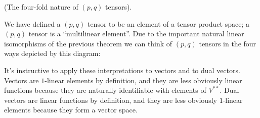 \begin{remark}
    (The four-fold nature of $(p, q)$ tensors).
    
    We have defined a $(p, q)$ tensor to be an element of a tensor product space; a $(p, q)$ tensor is a ``multilinear element''. Due to the important natural linear isomorphisms of the previous theorem we can think of $(p, q)$ tensors in the four ways depicted by this diagram:
    
    \begin{center}
    \end{center}
    
    It's instructive to apply these interpretations to vectors and to dual vectors. Vectors are $1$-linear elements by definition, and they are less obviously linear functions because they are naturally identifiable with elements of $V^{**}$. Dual vectors are linear functions by definition, and they are less obviously $1$-linear elements because they form a vector space.
\end{remark}

